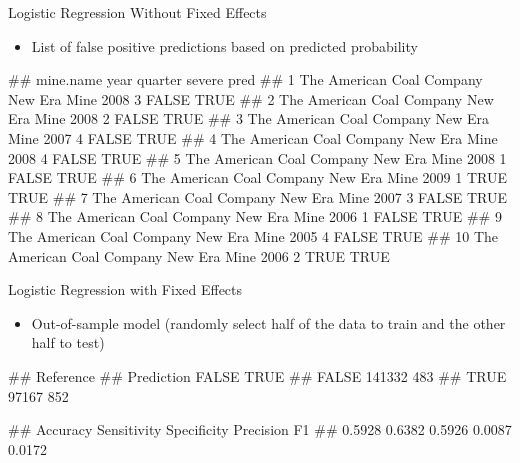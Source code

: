 \documentclass[
]{beamer}
\providecommand{\tightlist}{%
  \setlength{\itemsep}{0pt}\setlength{\parskip}{0pt}}
\let\oldverbatim\verbatim
\let\endoldverbatim\endverbatim
\renewenvironment{verbatim}{\footnotesize\oldverbatim}{\endoldverbatim}
\begin{document}
\begin{frame}[fragile]{Logistic Regression Without Fixed Effects}

\begin{itemize}
\tightlist
\item
  List of false positive predictions based on predicted probability 
\end{itemize}

\begin{verbatim}
##                                 mine.name year quarter severe pred
## 1  The American Coal Company New Era Mine 2008       3  FALSE TRUE
## 2  The American Coal Company New Era Mine 2008       2  FALSE TRUE
## 3  The American Coal Company New Era Mine 2007       4  FALSE TRUE
## 4  The American Coal Company New Era Mine 2008       4  FALSE TRUE
## 5  The American Coal Company New Era Mine 2008       1  FALSE TRUE
## 6  The American Coal Company New Era Mine 2009       1   TRUE TRUE
## 7  The American Coal Company New Era Mine 2007       3  FALSE TRUE
## 8  The American Coal Company New Era Mine 2006       1  FALSE TRUE
## 9  The American Coal Company New Era Mine 2005       4  FALSE TRUE
## 10 The American Coal Company New Era Mine 2006       2   TRUE TRUE
\end{verbatim}

\end{frame}

\begin{frame}[fragile]{Logistic Regression with Fixed Effects}

\begin{itemize}
\tightlist
\item
  Out-of-sample model (randomly select half of the data to train and the
  other half to test)
\end{itemize}

\begin{verbatim}
##           Reference
## Prediction  FALSE   TRUE
##      FALSE 141332    483
##      TRUE   97167    852
\end{verbatim}

\begin{verbatim}
##    Accuracy Sensitivity Specificity   Precision          F1 
##      0.5928      0.6382      0.5926      0.0087      0.0172
\end{verbatim}

\end{frame}
\end{document}
